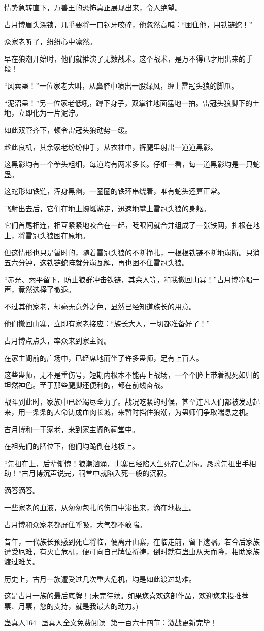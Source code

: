 \begin{this_body}
情势急转直下，万兽王的恐怖真正展现出来，令人绝望。

古月博眉头深锁，几乎要将一口钢牙咬碎，他忽然高喊：“困住他，用铁链蛇！”

众家老听了，纷纷心中凛然。

早在狼潮开始时，他们就推演了无数战术。这个战术，是万不得已才用出来的手段！

“风索蛊！”一位家老大叫，从鼻腔中喷出一股绿风，缠上雷冠头狼的脚爪。

“泥沼蛊！”另一位家老低吼，蹲下身子，双掌往地面猛地一拍。雷冠头狼脚下的土地，立即化为一片泥泞。

如此双管齐下，顿令雷冠头狼动势一缓。

趁此良机，其余家老纷纷伸手，从衣袖中，裤腿里射出一道道黑影。

这黑影均有一个拳头粗细，每道均有两米多长。仔细一看，每一道黑影均是一只蛇蛊。

这蛇形如铁链，浑身黑幽，一圈圈的铁环串绕着，唯有蛇头还算正常。

飞射出去后，它们在地上蜿蜒游走，迅速地攀上雷冠头狼的身躯。

它们首尾相连，相互紧紧地咬合在一起，眨眼间就合并组成了一张铁网，扎根在地上，将雷冠头狼困在原地。

但这情形也只是暂时的，随着雷冠头狼的不断挣扎，一根根铁链不断地崩断。只消五六分钟，这铁链蛇阵就分崩瓦解，再也困不住雷冠头狼。

“赤光、索平留下，防止狼群冲击铁链，其余人等，和我撤回山寨！”古月博冷喝一声，竟然选择了撤退。

不过其他家老，却毫无意外之色，显然已经知道族长的用意。

他们撤回山寨，立即有家老接应：“族长大人，一切都准备好了！”

古月博点点头，率众来到家主阁。

在家主阁前的广场中，已经席地而坐了许多蛊师，足有上百人。

这些蛊师，无不是重伤号，短期内根本不能再上战场，一个个脸上带着视死如归的坦然神色。至于那些腿脚还便利的，都在前线奋战。

战斗到此时，家族中已经竭尽全力了。战况吃紧的时候，甚至连凡人们都被发动起来，用一条条的人命铸成血肉长城，来暂时挡住狼潮，为蛊师们争取喘息之机。

古月博和一干家老，来到家主阁的祠堂中。

在祖先们的牌位下，他们均跪倒在地板上。

“先祖在上，后辈惭愧！狼潮汹涌，山寨已经陷入生死存亡之际。恳求先祖出手相助！”古月博沉声说完，祠堂中就陷入死一般的沉寂。

滴答滴答。

一些家老的血液，从匆匆包扎的伤口中渗出来，滴在地板上。

古月博和众家老都屏住呼吸，大气都不敢喘。

昔年，一代族长预感到死亡将临，便离开山寨，在临走前，留下遗嘱。若今后家族遭受厄难，有灭亡危机，便可向自己牌位祈祷，倒时就有蛊虫从天而降，相助家族渡过难关。

历史上，古月一族遭受过几次重大危机，均是如此渡过劫难。

这是古月一族的最后底牌！(未完待续。如果您喜欢这部作品，欢迎您来投推荐票、月票，您的支持，就是我最大的动力。)

蛊真人164\_蛊真人全文免费阅读\_第一百六十四节：激战更新完毕！

\end{this_body}

